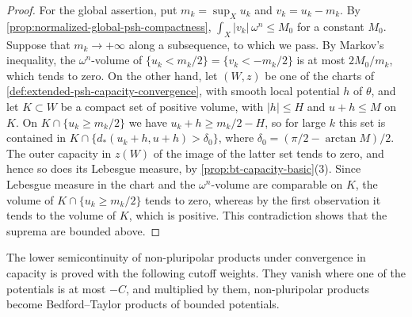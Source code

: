 \begin{proof}
For the global assertion, put $m_k=\sup_Xu_k$ and $v_k=u_k-m_k$. By \cref{prop:normalized-global-psh-compactness}, $\int_X|v_k|\,\omega^n\leq M_0$ for a constant $M_0$. Suppose that $m_k\to+\infty$ along a subsequence, to which we pass. By Markov's inequality, the $\omega^n$-volume of $\{u_k<m_k/2\}=\{v_k<-m_k/2\}$ is at most $2M_0/m_k$, which tends to zero. On the other hand, let $(W,z)$ be one of the charts of \cref{def:extended-psh-capacity-convergence}, with smooth local potential $h$ of $\theta$, and let $K\subset W$ be a compact set of positive volume, with $|h|\leq H$ and $u+h\leq M$ on $K$. On $K\cap\{u_k\geq m_k/2\}$ we have $u_k+h\geq m_k/2-H$, so for large $k$ this set is contained in $K\cap\{d_*(u_k+h,u+h)>\delta_0\}$, where $\delta_0=(\pi/2-\arctan M)/2$. The outer capacity in $z(W)$ of the image of the latter set tends to zero, and hence so does its Lebesgue measure, by \cref{prop:bt-capacity-basic}(3). Since Lebesgue measure in the chart and the $\omega^n$-volume are comparable on $K$, the volume of $K\cap\{u_k\geq m_k/2\}$ tends to zero, whereas by the first observation it tends to the volume of $K$, which is positive. This contradiction shows that the suprema are bounded above.
\end{proof}

The lower semicontinuity of non-pluripolar products under convergence in capacity is proved with the following cutoff weights. They vanish where one of the potentials is at most $-C$, and multiplied by them, non-pluripolar products become Bedford--Taylor products of bounded potentials.

